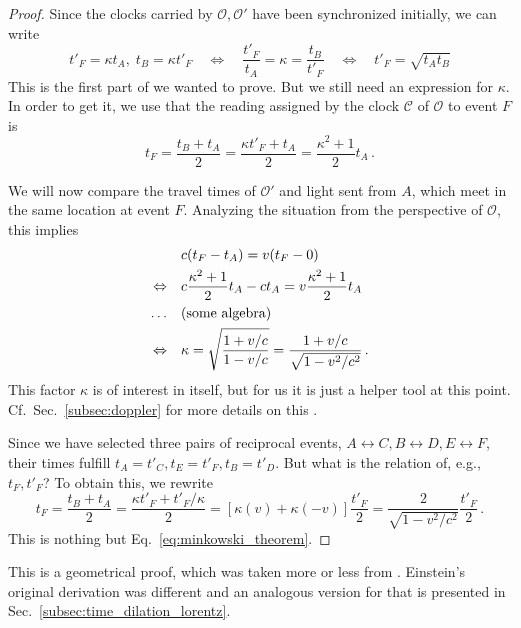 \documentclass[../relativity_main.tex]{subfiles}
\begin{document}
\begin{proof}
	Since the clocks carried by $\mathcal{O}, \mathcal{O}'$ have been synchronized initially, we can write
	\begin{equation}
		t'_F = \kappa t_A, \; t_B = \kappa t'_F \quad \Leftrightarrow \quad \frac{t'_F}{t_A} = \kappa = \frac{t_B}{t'_F} \quad \Leftrightarrow \quad t'_F = \sqrt{t_A t_B}
	\end{equation}
	This is the first part of we wanted to prove. But we still need an expression for $\kappa$. In order to get it, we use that the reading assigned by the clock $\mathcal{C}$ of $\mathcal{O}$ to event $F$ is
	\begin{equation}
		t_F = \frac{t_B + t_A}{2} = \frac{\kappa t'_F + t_A}{2} = \frac{\kappa^2 + 1}{2} t_A \, .
	\end{equation}

	We will now compare the travel times of $\mathcal{O}'$ and light sent from $A$, which meet in the same location at event $F$. Analyzing the situation from the perspective of $\mathcal{O}$, this implies
	\begin{align}
		& \quad c (t_F - t_A) = v (t_F - 0)
		\notag\\
		\Leftrightarrow & \quad c \frac{\kappa^2 + 1}{2} t_A - c t_A = v \frac{\kappa^2 + 1}{2} t_A
		\notag\\
		\dots & \quad \text{(some algebra)}
		\notag\\
		\Leftrightarrow & \quad \kappa = \sqrt{\frac{1 + v / c}{1 - v / c}} = \frac{1 + v / c}{\sqrt{1 - v^2 / c^2}} \, .
		\label{eq:doppler_derivation}
	\end{align}
	This factor $\kappa$ is of interest in itself, but for us it is just a helper tool at this point. Cf.~Sec.~\ref{subsec:doppler} for more details on this .

	Since we have selected three pairs of reciprocal events, $A \leftrightarrow C, B \leftrightarrow D, E \leftrightarrow F$, their times fulfill $t_A = t'_C, t_E = t'_F, t_B = t'_D$. But what is the relation of, e.g., $t_F, t'_F$? To obtain this, we rewrite
	\begin{equation}
		t_F = \frac{t_B + t_A}{2} = \frac{\kappa t'_F + t'_F / \kappa}{2} = [\kappa(v) + \kappa(-v)] \frac{t'_F}{2} = \frac{2}{\sqrt{1 - v^2 / c^2}} \frac{t'_F}{2} \, .
	\end{equation}
	This is nothing but Eq.~\eqref{eq:minkowski_theorem}.
\end{proof}
This is a geometrical proof, which was taken more or less from \cite{dragon_geometry_srt}. Einstein's original derivation was different and an analogous version for that is presented in Sec.~\ref{subsec:time_dilation_lorentz}.
\end{document}
